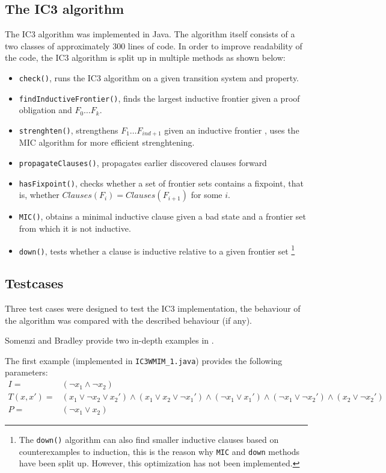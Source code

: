 \documentclass[a4paper]{article}
\begin{document}
\newpage
\subsection{The IC3 algorithm}
The IC3 algorithm was implemented in Java. The algorithm itself consists of a two classes of approximately 300 lines of code. In order to improve readability of the code, the IC3 algorithm is split up in multiple methods as shown below:

\begin{itemize}
\item \texttt{check()}, runs the IC3 algorithm on a given transition system and property.
\item \texttt{findInductiveFrontier()}, finds the largest inductive frontier given a proof obligation and $F_0 \ldots F_k$.
\item \texttt{strenghten()}, strengthens $F_1 \ldots F_{ind+1}$ given an inductive frontier	, uses the MIC algorithm for more efficient strenghtening.
\item \texttt{propagateClauses()}, propagates earlier discovered clauses forward
\item \texttt{hasFixpoint()}, checks whether a set of frontier sets contains a fixpoint, that is, whether $Clauses(F_i) = Clauses(F_{i+1})$ for some $i$.
\item \texttt{MIC()}, obtains a minimal inductive clause given a bad state and a frontier set from which it is not inductive.
\item \texttt{down()}, tests whether a clause is inductive relative to a given frontier set \footnote{The \texttt{down()} algorithm can also find smaller inductive clauses based on counterexamples to induction, this is the reason why \texttt{MIC} and \texttt{down} methods have been split up. However, this optimization has not been implemented.}
\end{itemize}

\subsection{Testcases}
\label{sec:ic3_testcases}
Three test cases were designed to test the IC3 implementation, the behaviour of the algorithm was compared with the described behaviour (if any).

Somenzi and Bradley provide two in-depth examples in \cite{Somenzi2011}.

The first example (implemented in \texttt{IC3WMIM\_1.java}) provides the following parameters:
\begin{align*}
I =& (\lnot x_1 \land \lnot x_2)\\
T(x,x') =& (x_1 \lor \lnot x_2 \lor x_2') \land (x_1 \lor x_2 \lor \lnot x_1') \land (\lnot x_1 \lor x_1') \land (\lnot x_1 \lor \lnot x_2') \land (x_2 \lor \lnot x_2') \\
P =& (\lnot x_1 \lor x_2)
\end{align*}
\end{document}
